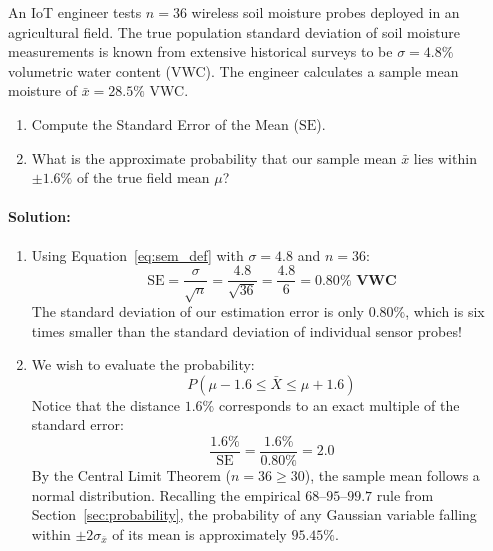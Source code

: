 \begin{example}
An IoT engineer tests $n = 36$ wireless soil moisture probes deployed in an agricultural field. The true population standard deviation of soil moisture measurements is known from extensive historical surveys to be $\sigma = 4.8\%$ volumetric water content (VWC). The engineer calculates a sample mean moisture of $\bar{x} = 28.5\%$ VWC.
\begin{enumerate}
    \item Compute the Standard Error of the Mean ($\text{SE}$).
    \item What is the approximate probability that our sample mean $\bar{x}$ lies within $\pm 1.6\%$ of the true field mean $\mu$?
\end{enumerate}

\paragraph{Solution:}
\begin{enumerate}
    \item Using Equation~\eqref{eq:sem_def} with $\sigma = 4.8$ and $n = 36$:
    \begin{equation*}
    \text{SE} = \frac{\sigma}{\sqrt{n}} = \frac{4.8}{\sqrt{36}} = \frac{4.8}{6} = \mathbf{0.80\%\text{ VWC}}
    \end{equation*}
    The standard deviation of our estimation error is only $0.80\%$, which is six times smaller than the standard deviation of individual sensor probes!
    \item We wish to evaluate the probability:
    \begin{equation*}
    P(\mu - 1.6 \le \bar{X} \le \mu + 1.6)
    \end{equation*}
    Notice that the distance $1.6\%$ corresponds to an exact multiple of the standard error:
    \begin{equation*}
    \frac{1.6\%}{\text{SE}} = \frac{1.6\%}{0.80\%} = 2.0
    \end{equation*}
    By the Central Limit Theorem ($n = 36 \ge 30$), the sample mean follows a normal distribution. Recalling the empirical $68$--$95$--$99.7$ rule from Section~\ref{sec:probability}, the probability of any Gaussian variable falling within $\pm 2\sigma_{\bar{x}}$ of its mean is approximately $\mathbf{95.45\%}$.
\end{enumerate}
\end{example}

